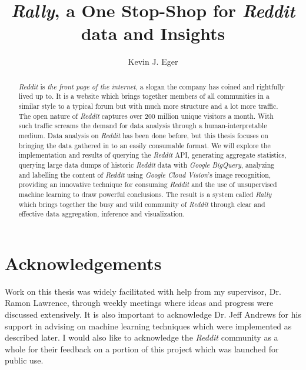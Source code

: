 \documentclass[msc,oneside]{ubcthesis}%
\title{\emph{Rally}, a One Stop-Shop for \textit{Reddit} data and Insights}
\author{Kevin J. Eger}
\begin{document}
\frontmatter                    %

\maketitle                      %

\begin{abstract}                %
\textit{\textit{Reddit}} is \emph{the front page of the internet}, a slogan the company has coined and rightfully lived up to. It is a website which brings together members of all communities in a similar style to a typical forum but with much more structure and a lot more traffic. The open nature of \textit{Reddit} captures over 200 million unique visitors a month. With such traffic screams the demand for data analysis through a human-interpretable medium. Data analysis on \textit{Reddit} has been done before, but this thesis focuses on bringing the data gathered in to an easily consumable format. We will explore the implementation and results of querying the \textit{Reddit} API, generating aggregate statistics, querying large data dumps of historic \textit{Reddit} data with \emph{Google BigQuery}, analyzing and labelling the content of \textit{Reddit} using \textit{Google Cloud Vision}'s image recognition, providing an innovative technique for consuming \textit{Reddit} and the use of unsupervised machine learning to draw powerful conclusions. The result is a system called \textit{Rally} which brings together the busy and wild community of \textit{Reddit} through clear and effective data aggregation, inference and visualization.
\end{abstract}

\newpage
{} \label{tableofcontent}%
\tableofcontents                %
\newpage 
{} \label{listoftab}%
\listoftables                   %
\newpage
{} \label{listoffig}%
\listoffigures                  %


\chapter{Acknowledgements}      %
Work on this thesis was widely facilitated with help from my supervisor, Dr. Ramon Lawrence, through weekly meetings where ideas and progress were discussed extensively. It is also important to acknowledge Dr. Jeff Andrews for his support in advising on machine learning techniques which were implemented as described later. I would also like to acknowledge the \textit{Reddit} community as a whole for their feedback on a portion of this project which was launched for public use.
\end{document}
